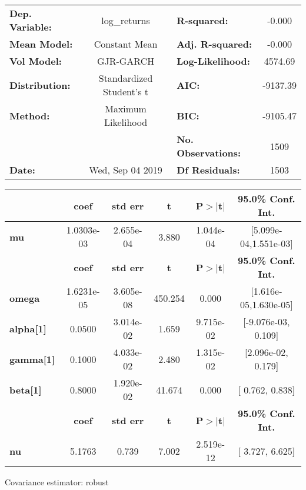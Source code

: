 \begin{center}
\begin{tabular}{lclc}
\toprule
\textbf{Dep. Variable:} &       log\_returns       & \textbf{  R-squared:         } &    -0.000   \\
\textbf{Mean Model:}    &      Constant Mean       & \textbf{  Adj. R-squared:    } &    -0.000   \\
\textbf{Vol Model:}     &        GJR-GARCH         & \textbf{  Log-Likelihood:    } &    4574.69  \\
\textbf{Distribution:}  & Standardized Student's t & \textbf{  AIC:               } &   -9137.39  \\
\textbf{Method:}        &    Maximum Likelihood    & \textbf{  BIC:               } &   -9105.47  \\
\textbf{}               &                          & \textbf{  No. Observations:  } &    1509     \\
\textbf{Date:}          &     Wed, Sep 04 2019     & \textbf{  Df Residuals:      } &    1503     \\
\bottomrule
\end{tabular}
\begin{tabular}{lccccc}
            & \textbf{coef} & \textbf{std err} & \textbf{t} & \textbf{P$> |$t$|$} & \textbf{95.0\% Conf. Int.}  \\
\midrule
\textbf{mu} &   1.0303e-03  &    2.655e-04     &     3.880  &      1.044e-04       &   [5.099e-04,1.551e-03]     \\
                  & \textbf{coef} & \textbf{std err} & \textbf{t} & \textbf{P$> |$t$|$} & \textbf{95.0\% Conf. Int.}  \\
\midrule
\textbf{omega}    &   1.6231e-05  &    3.605e-08     &   450.254  &        0.000         &   [1.616e-05,1.630e-05]     \\
\textbf{alpha[1]} &       0.0500  &    3.014e-02     &     1.659  &      9.715e-02       &    [-9.076e-03,  0.109]     \\
\textbf{gamma[1]} &       0.1000  &    4.033e-02     &     2.480  &      1.315e-02       &    [2.096e-02,  0.179]      \\
\textbf{beta[1]}  &       0.8000  &    1.920e-02     &    41.674  &        0.000         &     [  0.762,  0.838]       \\
            & \textbf{coef} & \textbf{std err} & \textbf{t} & \textbf{P$> |$t$|$} & \textbf{95.0\% Conf. Int.}  \\
\midrule
\textbf{nu} &       5.1763  &        0.739     &     7.002  &      2.519e-12       &     [  3.727,  6.625]       \\
\bottomrule
\end{tabular}
\end{center}

Covariance estimator: robust
